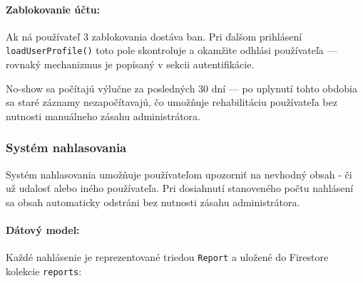   \paragraph{Zablokovanie účtu:}
  Ak ná používateľ 3 zablokovania dostáva ban. Pri ďalšom prihlásení \texttt{loadUserProfile()} toto
  pole skontroluje a okamžite odhlási používateľa — rovnaký mechanizmus je
  popísaný v sekcii autentifikácie.

  No-show sa počítajú výlučne za posledných 30 dní — po uplynutí tohto obdobia
  sa staré záznamy nezapočítavajú, čo umožňuje rehabilitáciu používateľa bez
  nutnosti manuálneho zásahu administrátora.

  \subsubsection{Systém nahlasovania}

  Systém nahlasovania umožňuje používateľom upozorniť na nevhodný obsah -
  či už udalosť alebo iného používateľa. Pri dosiahnutí stanoveného počtu
  nahlásení sa obsah automaticky odstráni bez nutnosti zásahu administrátora.

  \iffalse                                                                                                                                                                                                                         
  \paragraph{Dátový model:}
  Každé nahlásenie je reprezentované triedou \texttt{Report} a uložené
  do Firestore kolekcie \texttt{reports}:

